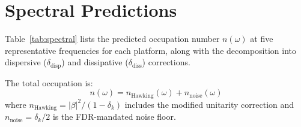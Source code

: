\documentclass[aps,prd,twocolumn,showpacs,superscriptaddress,nofootinbib]{revtex4-2}
\begin{document}
\section{Spectral Predictions}

Table~\ref{tab:spectral} lists the predicted occupation number $n(\omega)$
at five representative frequencies for each platform, along with the
decomposition into dispersive ($\delta_\text{disp}$) and dissipative
($\delta_\text{diss}$) corrections.

The total occupation is:
\begin{equation}
n(\omega) = n_\text{Hawking}(\omega) + n_\text{noise}(\omega)
\end{equation}
where $n_\text{Hawking} = |\beta|^2 / (1 - \delta_k)$ includes the
modified unitarity correction and $n_\text{noise} = \delta_k/2$ is the
FDR-mandated noise floor.
\end{document}
